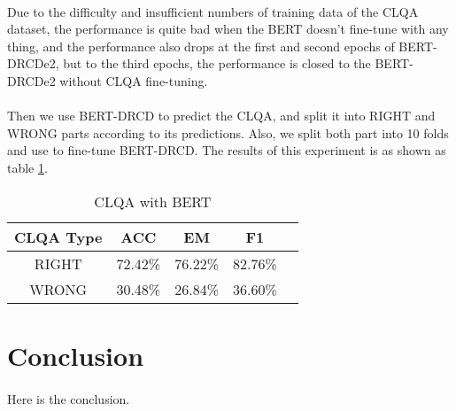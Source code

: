 \documentclass{article}
\begin{document}
\paragraph{}
Due to the difficulty and insufficient numbers of training data of the CLQA dataset, the performance is quite bad when the BERT doesn't fine-tune with any thing, and the performance also drops at the first and second epochs of BERT-DRCDe2, but to the third epochs, the performance is closed to the BERT-DRCDe2 without CLQA fine-tuning.

\paragraph{}
Then we use BERT-DRCD to predict the CLQA, and split it into RIGHT and WRONG parts according to its predictions. Also, we split both part into 10 folds and use to fine-tune BERT-DRCD. The results of this experiment is as shown as table \ref{tab:bert-clqa-right-wrong}.

\begin{table}[h!]
  \centering
  \caption{CLQA with BERT}
  \begin{tabular}{ccccc}
    CLQA Type & ACC & EM & F1\\
    \toprule
    RIGHT & 72.42\% & 76.22\% & 82.76\% \\
    WRONG & 30.48\% & 26.84\% & 36.60\% \\
  \end{tabular}
  \label{tab:bert-clqa-right-wrong}
\end{table}

\section{Conclusion}
\paragraph{}
Here is the conclusion.



\end{document}
